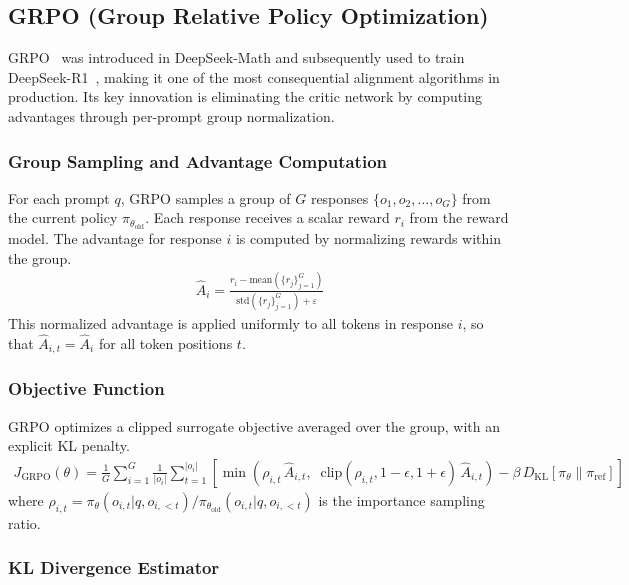 \documentclass[12pt]{article}
\begin{document}
\subsection{GRPO (Group Relative Policy Optimization)}

GRPO~\cite{Shao2024DeepSeekMath} was introduced in DeepSeek-Math and subsequently used to train DeepSeek-R1~\cite{Guo2025DeepSeekR1}, making it one of the most consequential alignment algorithms in production. Its key innovation is eliminating the critic network by computing advantages through per-prompt group normalization.

\subsubsection{Group Sampling and Advantage Computation}

For each prompt $q$, GRPO samples a group of $G$ responses $\{o_1, o_2, \ldots, o_G\}$ from the current policy $\pi_{\theta_{\text{old}}}$. Each response receives a scalar reward $r_i$ from the reward model. The advantage for response $i$ is computed by normalizing rewards within the group.
\begin{align}
\hat{A}_i = \frac{r_i - \text{mean}(\{r_j\}_{j=1}^G)}{\text{std}(\{r_j\}_{j=1}^G) + \varepsilon}
\end{align}
This normalized advantage is applied uniformly to all tokens in response $i$, so that $\hat{A}_{i,t} = \hat{A}_i$ for all token positions $t$.

\subsubsection{Objective Function}

GRPO optimizes a clipped surrogate objective averaged over the group, with an explicit KL penalty.
\begin{align}
J_{\text{GRPO}}(\theta) = \frac{1}{G} \sum_{i=1}^{G} \frac{1}{|o_i|} \sum_{t=1}^{|o_i|} \left[ \min\!\left( \rho_{i,t} \, \hat{A}_{i,t}, \;\; \text{clip}(\rho_{i,t}, 1{-}\epsilon, 1{+}\epsilon) \, \hat{A}_{i,t} \right) - \beta \, D_{\text{KL}}[\pi_\theta \| \pi_{\text{ref}}] \right]
\end{align}
where $\rho_{i,t} = \pi_\theta(o_{i,t} | q, o_{i,<t}) / \pi_{\theta_{\text{old}}}(o_{i,t} | q, o_{i,<t})$ is the importance sampling ratio.

\subsubsection{KL Divergence Estimator}
\end{document}
